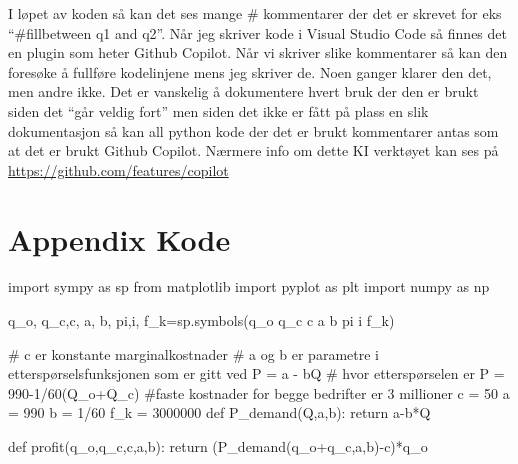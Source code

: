 \documentclass[
  12pt,
  a4paper,
  DIV=11,
  numbers=noendperiod]{scrartcl}
\newenvironment{Shaded}{\begin{snugshade}}{\end{snugshade}}
\newcommand{\CommentTok}[1]{\textcolor[rgb]{0.37,0.37,0.37}{#1}}
\newcommand{\ControlFlowTok}[1]{\textcolor[rgb]{0.00,0.23,0.31}{#1}}
\newcommand{\DecValTok}[1]{\textcolor[rgb]{0.68,0.00,0.00}{#1}}
\newcommand{\ImportTok}[1]{\textcolor[rgb]{0.00,0.46,0.62}{#1}}
\newcommand{\KeywordTok}[1]{\textcolor[rgb]{0.00,0.23,0.31}{#1}}
\newcommand{\NormalTok}[1]{\textcolor[rgb]{0.00,0.23,0.31}{#1}}
\newcommand{\OperatorTok}[1]{\textcolor[rgb]{0.37,0.37,0.37}{#1}}
\newcommand{\StringTok}[1]{\textcolor[rgb]{0.13,0.47,0.30}{#1}}
\begin{document}
I løpet av koden så kan det ses mange \# kommentarer der det er skrevet
for eks ``\#fillbetween q1 and q2''. Når jeg skriver kode i Visual
Studio Code så finnes det en plugin som heter Github Copilot. Når vi
skriver slike kommentarer så kan den foresøke å fullføre kodelinjene
mens jeg skriver de. Noen ganger klarer den det, men andre ikke. Det er
vanskelig å dokumentere hvert bruk der den er brukt siden det ``går
veldig fort'' men siden det ikke er fått på plass en slik dokumentasjon
så kan all python kode der det er brukt kommentarer antas som at det er
brukt Github Copilot. Nærmere info om dette KI verktøyet kan ses på
\url{https://github.com/features/copilot}

\clearpage

\section {Appendix Kode}

\begin{Shaded}
\begin{Highlighting}[]
\ImportTok{import}\NormalTok{ sympy }\ImportTok{as}\NormalTok{ sp}
\ImportTok{from}\NormalTok{ matplotlib }\ImportTok{import}\NormalTok{ pyplot }\ImportTok{as}\NormalTok{ plt}
\ImportTok{import}\NormalTok{ numpy }\ImportTok{as}\NormalTok{ np}

\NormalTok{q\_o, q\_c,c, a, b, pi,i, f\_k}\OperatorTok{=}\NormalTok{sp.symbols(}\StringTok{\textquotesingle{}q\_o q\_c c a b pi i f\_k\textquotesingle{}}\NormalTok{)}


\CommentTok{\# c er konstante marginalkostnader}
\CommentTok{\# a og b er parametre i etterspørselsfunksjonen som er gitt ved P = a {-} bQ}
\CommentTok{\# hvor etterspørselen er P = 990{-}1/60(Q\_o+Q\_c)}
\CommentTok{\#faste kostnader for begge bedrifter er 3 millioner}
\NormalTok{c }\OperatorTok{=} \DecValTok{50}
\NormalTok{a }\OperatorTok{=} \DecValTok{990}
\NormalTok{b }\OperatorTok{=} \DecValTok{1}\OperatorTok{/}\DecValTok{60}
\NormalTok{f\_k }\OperatorTok{=} \DecValTok{3000000}
\KeywordTok{def}\NormalTok{ P\_demand(Q,a,b):}
    \ControlFlowTok{return}\NormalTok{ a}\OperatorTok{{-}}\NormalTok{b}\OperatorTok{*}\NormalTok{Q}

\KeywordTok{def}\NormalTok{ profit(q\_o,q\_c,c,a,b):}
    \ControlFlowTok{return}\NormalTok{ (P\_demand(q\_o}\OperatorTok{+}\NormalTok{q\_c,a,b)}\OperatorTok{{-}}\NormalTok{c)}\OperatorTok{*}\NormalTok{q\_o}
\end{Highlighting}
\end{Shaded}
\end{document}
